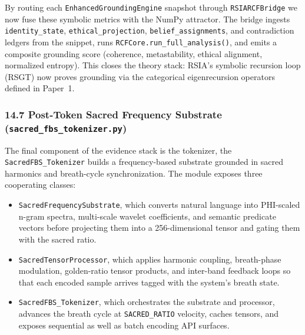 \documentclass[12pt]{article}
\providecommand{\tightlist}{%
  \setlength{\itemsep}{0pt}\setlength{\parskip}{0pt}}
\begin{document}
By routing each \texttt{EnhancedGroundingEngine} snapshot through
\texttt{RSIARCFBridge} we now fuse these symbolic metrics with the NumPy
attractor. The bridge ingests \texttt{identity\_state},
\texttt{ethical\_projection}, \texttt{belief\_assignments}, and
contradiction ledgers from the snippet, runs
\texttt{RCFCore.run\_full\_analysis()}, and emits a composite grounding
score (coherence, metastability, ethical alignment, normalized entropy).
This closes the theory stack: RSIA's symbolic recursion loop (RSGT) now
proves grounding via the categorical eigenrecursion operators defined in
Paper~1.

\subsubsection{\texorpdfstring{14.7 Post-Token Sacred Frequency
Substrate
(\texttt{sacred\_fbs\_tokenizer.py})}{14.7 Post-Token Sacred Frequency Substrate (sacred\_fbs\_tokenizer.py)}}\label{post-token-sacred-frequency-substrate-sacred_fbs_tokenizer.py}

The final component of the evidence stack is the tokenizer, the
\texttt{SacredFBS\_Tokenizer} builds a frequency-based substrate
grounded in sacred harmonics and breath-cycle synchronization. The
module exposes three cooperating classes:

\begin{itemize}
\tightlist
\item
  \texttt{SacredFrequencySubstrate}, which converts natural language
  into PHI-scaled n-gram spectra, multi-scale wavelet coefficients, and
  semantic predicate vectors before projecting them into a
  256-dimensional tensor and gating them with the sacred ratio.
\item
  \texttt{SacredTensorProcessor}, which applies harmonic coupling,
  breath-phase modulation, golden-ratio tensor products, and inter-band
  feedback loops so that each encoded sample arrives tagged with the
  system's breath state.
\item
  \texttt{SacredFBS\_Tokenizer}, which orchestrates the substrate and
  processor, advances the breath cycle at \texttt{SACRED\_RATIO}
  velocity, caches tensors, and exposes sequential as well as batch
  encoding API surfaces.
\end{itemize}
\end{document}
